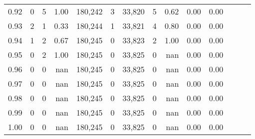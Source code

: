 \begin{tabular}{rrrrrrrrrrrrrr}
0.92 &      0 &      5 &  1.00 &  180,242 &        3 &  33,820 &       5 &  0.62 &  0.00 &      0.00 \\
0.93 &      2 &      1 &  0.33 &  180,244 &        1 &  33,821 &       4 &  0.80 &  0.00 &      0.00 \\
0.94 &      1 &      2 &  0.67 &  180,245 &        0 &  33,823 &       2 &  1.00 &  0.00 &      0.00 \\
0.95 &      0 &      2 &  1.00 &  180,245 &        0 &  33,825 &       0 &   nan &  0.00 &      0.00 \\
0.96 &      0 &      0 &   nan &  180,245 &        0 &  33,825 &       0 &   nan &  0.00 &      0.00 \\
0.97 &      0 &      0 &   nan &  180,245 &        0 &  33,825 &       0 &   nan &  0.00 &      0.00 \\
0.98 &      0 &      0 &   nan &  180,245 &        0 &  33,825 &       0 &   nan &  0.00 &      0.00 \\
0.99 &      0 &      0 &   nan &  180,245 &        0 &  33,825 &       0 &   nan &  0.00 &      0.00 \\
1.00 &      0 &      0 &   nan &  180,245 &        0 &  33,825 &       0 &   nan &  0.00 &      0.00 \\
\bottomrule
\end{tabular}
